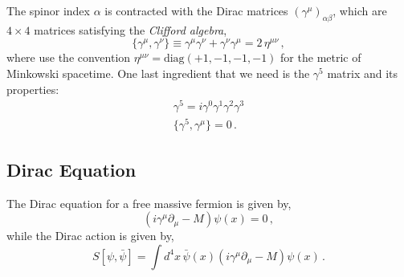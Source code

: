 \documentclass[11pt]{article}
\theoremstyle{definition}
\begin{document}
The spinor index $\alpha$ is contracted with the Dirac matrices $(\gamma^\mu)_{\alpha\beta}$, which are $4\times4$ matrices satisfying the \textit{Clifford algebra},
\begin{equation}\label{eqn:clifford}
  \{\gamma^\mu, \gamma^\nu\} \equiv \gamma^\mu \gamma^\nu + \gamma^\nu \gamma^\mu = 2\, \eta^{\mu\nu}\,,
\end{equation}
where use the convention $\eta^{\mu\nu} = \text{diag}(+1,-1,-1,-1)$ for the metric of Minkowski spacetime. One last ingredient that we need is the $\gamma^5$ matrix and its properties:
\begin{eqnarray*}
    \gamma^5 = i \gamma^0 \gamma^1 \gamma^2 \gamma^3 \\
    \{ \gamma^5,\gamma^{\mu} \} = 0 \,.
\end{eqnarray*}

\subsection*{Dirac Equation}
The Dirac equation for a free massive fermion is given by,
\begin{equation}
    \left(i\gamma^{\mu}\partial_{\mu} - M \right)\psi(x)=0 \,,
\end{equation}
while the Dirac action is given by,
\begin{equation}
   S[\psi,\bar{\psi}] = \int d^4x \, \bar{\psi}(x) \left(i\gamma^{\mu}\partial_{\mu} - M \right)\psi(x) \,.
\end{equation}
\end{document}
